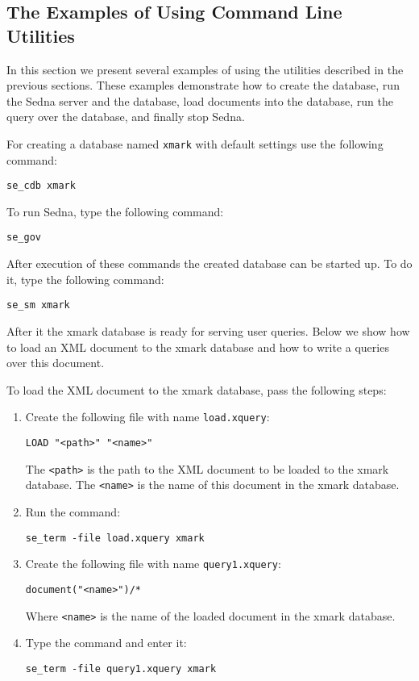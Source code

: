 \documentclass[a4paper,12pt]{article}
\begin{document}
\subsection{The Examples of Using Command Line Utilities}

In this section we present several examples of using the utilities described in the previous sections. These examples demonstrate how to create the database, run the Sedna server and the database, load documents into the database, run the query over the database, and finally stop Sedna.

For creating a database named \verb!xmark! with default settings use the following command:

\begin{verbatim}
se_cdb xmark
\end{verbatim}

To run Sedna, type the following command:

\begin{verbatim}
se_gov
\end{verbatim}

After execution of these commands the created database can be started up. To do it, type the following command:

\begin{verbatim}
se_sm xmark
\end{verbatim}

After it the xmark database is ready for serving user queries. Below we show how to load an XML document to the xmark database and how to write a queries over this document.

To load the XML document to the xmark database, pass the following steps:

\begin{enumerate}
\item Create the following file with name \verb!load.xquery!:

\begin{verbatim}
LOAD "<path>" "<name>"
\end{verbatim}

The \verb!<path>! is the path to the XML document to be loaded to the xmark database. The \verb!<name>! is the name of this document in the xmark database.

\item Run the command: 

\begin{verbatim}
se_term -file load.xquery xmark
\end{verbatim}

\item Create the following file with name \verb!query1.xquery!:

\begin{verbatim}
document("<name>")/*
\end{verbatim}

Where \verb!<name>! is the name of the loaded document in the xmark database.

\item Type the command and enter it:
\begin{verbatim}
se_term -file query1.xquery xmark
\end{verbatim}
\end{enumerate}
\end{document}

